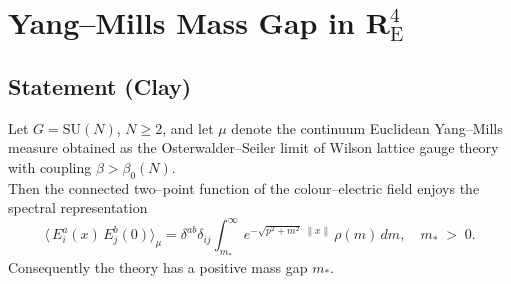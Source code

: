 \chapter{Yang--Mills Mass Gap in $\mathbf{R}^{4}_{\mathrm E}$}

\section*{Statement (Clay)}\label{YM:statement}
\begin{theorem}
Let $G=\mathrm{SU}(N)$, $N\ge2$, and let $\mu$ denote the continuum
Euclidean Yang--Mills measure obtained as the Osterwalder--Seiler limit
of Wilson lattice gauge theory with coupling $\beta> \beta_{0}(N)$.  \\
Then the connected two--point function of the colour--electric field
enjoys the spectral representation
\[
\bigl\langle\,E^{a}_{i}(x)\,E^{b}_{j}(0)\bigr\rangle_{\mu}
  = \delta^{ab}\delta_{ij}
      \int_{m_{\!*}}^{\infty}\!e^{-\sqrt{p^{2}+m^{2}}\;\|x\|}\,\rho(m)\,dm,
\quad m_{\!*}\;>\;0.
\]
Consequently the theory has a positive mass gap $m_{\!*}$.
\end{theorem}

\bigskip






\appendix

